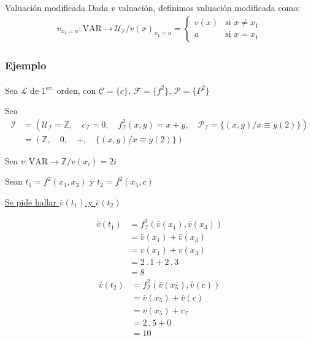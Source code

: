 \medskip

\begin{definicion}{Valuación modificada}{}
    Dada $v$ valuación, definimos valuación modificada como:
    \begin{gather*}
        v_{x_{1} = a}: \mathrm{VAR} \to \mathcal{U}_{\mathcal{I}} / v(x)_{x_{1}=a} =
        \begin{cases}
            v(x) & \text{si } x \neq x_1 \\
            a & \text{si } x = x_1
        \end{cases}
    \end{gather*}
\end{definicion}

\subsubsection{Ejemplo}

Sea $\mathcal{L}$ de 1\textsuperscript{er.} orden, con $\mathcal{C}=\{c\}$,
$\mathcal{F}=\{ f^{2} \}$, $\mathcal{P}=\{ P^{2} \}$

Sea 
\begin{align*}
    \mathcal{I} &= (\mathcal{U}_{\mathcal{I}} = \mathbb{Z}, \quad
            c_{\mathcal{I}} = 0, \quad
            f_{\mathcal{I}}^2 (x,y) = x+y, \quad
            \mathcal{P}_{\mathcal{I}} = \{ (x,y)/ x \equiv y (2) \}
    ) \\
    &= ( \mathbb{Z}, \quad
    0, \quad
    +, \quad
    \{ (x,y) / x \equiv y (2) \} )
\end{align*}

Sea $v: \mathrm{VAR} \to \mathbb{Z} / v(x_i) = 2i$

Sean $t_1 = f^{2} (x_1, x_3)$ y $t_2 = f^{2} (x_5, c)$

\underline{Se pide hallar $\bar{v}(t_1)$ y $\bar{v} (t_2)$}

\begin{align*}
    \bar{v}(t_1) &= f_{\mathcal{I}}^{2}(\bar{v}(x_1), \bar{v}(x_3)) \\
                 &= \bar{v}(x_1) + \bar{v}(x_3) \\
                 &= v(x_1) + v(x_3) \\
                 &= 2\, . \, 1 + 2 \, . \, 3 \\
                 &= 8 
\end{align*}
\begin{align*}
    \bar{v}(t_2) &= f_{\mathcal{I}}^{2}(\bar{v}(x_5), \bar{v}(c)) \\
                 &= \bar{v}(x_5) + \bar{v}(c) \\
                 &= v(x_5) + c_{\mathcal{I}} \\ 
                 &= 2\, . \, 5 + 0 \\
                 &= 10
\end{align*}

